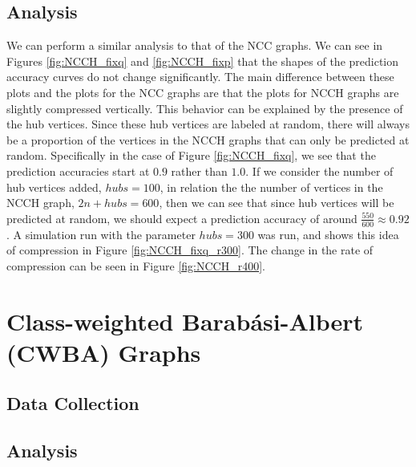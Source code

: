 \subsection{Analysis}
We can perform a similar analysis to that of the NCC graphs. We can see
in Figures \ref{fig:NCCH_fixq} and \ref{fig:NCCH_fixp} that the shapes of 
the prediction accuracy curves do not change significantly. The main
difference between these plots and the plots for the NCC graphs are that
the plots for NCCH graphs are slightly compressed vertically. This behavior
can be explained by the presence of the hub vertices. Since these hub
vertices are labeled at random, there will always be a proportion of the
vertices in the NCCH graphs that can only be predicted at random. 
Specifically in the case of Figure \ref{fig:NCCH_fixq}, we see that the
prediction accuracies start at $0.9$ rather than $1.0$. If we consider the
number of hub vertices added, $hubs=100$, in relation the the number of
vertices in the NCCH graph, $2n + hubs = 600$, then we can see that since
hub vertices will be predicted at random, we should expect a prediction
accuracy of around $\frac{550}{600} \approx 0.92$. A simulation run with
the parameter $hubs=300$ was run, and shows this idea of compression in
Figure \ref{fig:NCCH_fixq_r300}. The change in the rate of compression can
be seen in Figure \ref{fig:NCCH_r400}.

\section{Class-weighted Barab\'{a}si-Albert (CWBA) Graphs}
\subsection{Data Collection}
\subsection{Analysis}